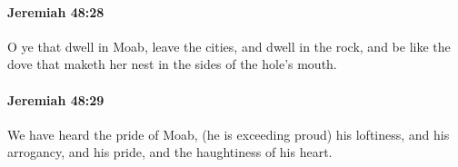 		\paragraph{Jeremiah 48:28} %
			\label{JEREMIAH-48-28}

			O ye that dwell in Moab, leave the cities, and dwell in the rock, and be like the dove that maketh her nest in the sides of the hole’s mouth.


		\paragraph{Jeremiah 48:29} %
			\label{JEREMIAH-48-29}

			We have heard the pride of Moab, (he is exceeding proud) his loftiness, and his arrogancy, and his pride, and the haughtiness of his heart.


